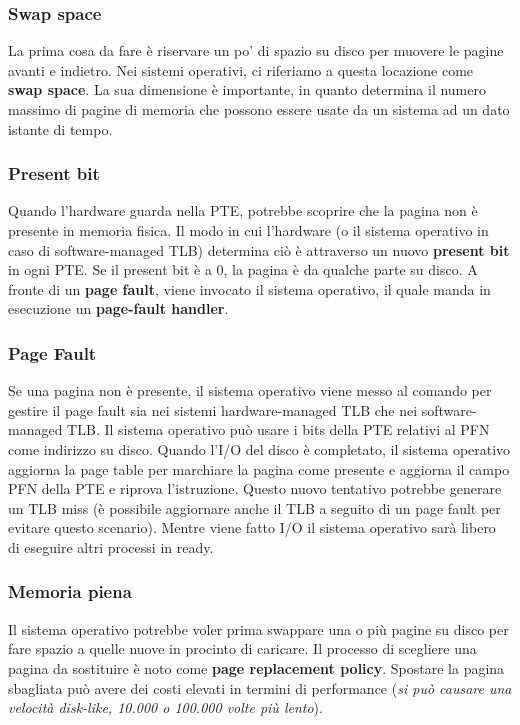 \documentclass[12pt, letterpaper]{article}
\begin{document}
			\subsubsection{Swap space}
				La prima cosa da fare è riservare un po' di spazio su disco per muovere le pagine avanti e indietro. Nei sistemi operativi, ci riferiamo a questa locazione come \textbf{swap space}. La sua dimensione è importante, in quanto determina il numero massimo di pagine di memoria che possono essere usate da un sistema ad un dato istante di tempo.
				
			\subsubsection{Present bit}
				Quando l'hardware guarda nella PTE, potrebbe scoprire che la pagina non è presente in memoria fisica. Il modo in cui l'hardware  (o il sistema operativo in caso di software-managed TLB) determina ciò è attraverso un nuovo \textbf{present bit} in ogni PTE. Se il present bit è a 0, la pagina è da qualche parte su disco. A fronte di un \textbf{page fault}, viene invocato il sistema operativo, il quale manda in esecuzione un \textbf{page-fault handler}.
				
			\subsubsection{Page Fault}
				Se una pagina non è presente, il sistema operativo viene messo al comando per gestire il page fault sia nei sistemi hardware-managed TLB che nei software-managed TLB. Il sistema operativo può usare i bits della PTE relativi al PFN come indirizzo su disco. Quando l'I/O del disco è completato, il sistema operativo aggiorna la page table per marchiare la pagina come presente e aggiorna il campo PFN della PTE e riprova l'istruzione. Questo nuovo tentativo potrebbe generare un TLB miss (è possibile aggiornare anche il TLB a seguito di un page fault per evitare questo scenario). Mentre viene fatto I/O il sistema operativo sarà libero di eseguire altri processi in ready. 
				
			\subsubsection{Memoria piena}
				Il sistema operativo potrebbe voler prima swappare una o più pagine su disco per fare spazio a quelle nuove in procinto di caricare. Il processo di scegliere una pagina da sostituire è noto come \textbf{page replacement policy}. Spostare la pagina sbagliata può avere dei costi elevati in termini di performance (\textit{si può causare una velocità disk-like, 10.000 o 100.000 volte più lento}).\\
				
\end{document}
